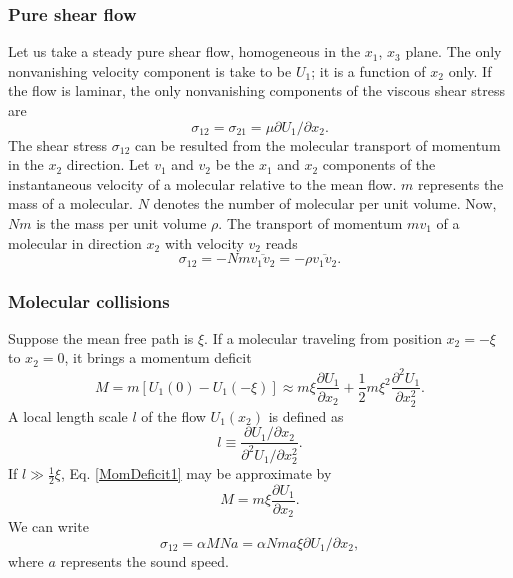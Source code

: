 \documentclass[review]{elsarticle}
\begin{document}
	\subsubsection{Pure shear flow}
		Let us take a steady pure shear flow, homogeneous in the $x_1$, $x_3$ plane. The only nonvanishing velocity 
		component is take to be $U_1$; it is a function of $x_2$ only. If the flow is laminar, the only nonvanishing 
		components of the viscous shear stress are 
		\begin{equation}
			\sigma_{12} = \sigma_{21} = \mu \partial U_1 / \partial x_2.
		\end{equation}
		The shear stress $\sigma_{12}$ can be resulted from the molecular transport of momentum in the $x_2$ direction.
		Let $v_1$ and $v_2$ be the $x_1$ and $x_2$ components of the instantaneous velocity of a molecular relative to 
		the mean flow. $m$ represents the mass of a molecular. $N$ denotes the number of molecular per unit volume. Now, 
		$Nm$ is the mass per unit volume $\rho$. The transport of momentum $mv_1$ of a molecular in direction $x_2$ with 
		velocity $v_2$ reads
		\begin{equation}
			\sigma_{12} = -Nm\overline{v_1v_2} = -\rho\overline{v_1v_2}.
		\end{equation}

	\subsubsection{Molecular collisions}
		Suppose the mean free path is $\xi$. If a molecular traveling from position $x_2 = -\xi$ to $x_2 = 0$, it brings 
		a momentum deficit 
		\begin{equation}\label{MomDeficit1}
			M = m[U_1(0) - U_1(-\xi)] \approx m\xi\frac{\partial U_1}{\partial x_2}+\frac{1}{2}m\xi^2\frac{\partial^2U_1}{\partial x_2^2}.
		\end{equation}  
		A local length scale $l$ of the flow $U_1(x_2)$ is defined as
		\begin{equation}\label{locallengthscale}
			l \equiv \frac{\partial U_1/\partial x_2}{\partial^2U_1/\partial x_2^2}.
		\end{equation}
		If $l \gg \frac{1}{2}\xi$, Eq. \ref{MomDeficit1} may be approximate by
		\begin{equation}
			M = m\xi\frac{\partial U_1}{\partial x_2}.
		\end{equation}
		We can write
		\begin{equation}
			\sigma_{12} = \alpha MNa = \alpha Nma\xi\partial U_1/\partial x_2,
		\end{equation}
		where $a$ represents the sound speed.
\end{document}
